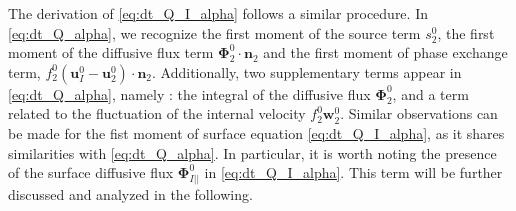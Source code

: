 The derivation of \ref{eq:dt_Q_I_alpha} follows a similar procedure. 
In \ref{eq:dt_Q_alpha}, we recognize the first moment of the source term $s_2^0$, the first moment of the diffusive flux term $\mathbf{\Phi}_2^0\cdot\textbf{n}_2$ and the first moment of phase exchange term, $f_2^0 (\textbf{u}_I^0-\textbf{u}_2^0)\cdot\textbf{n}_2$. 
Additionally, two supplementary terms appear in \ref{eq:dt_Q_alpha}, namely : the integral of the diffusive flux $\mathbf{\Phi}_2^0$, and a term related to the fluctuation of the internal velocity $f_2^0 \textbf{w}_2^0$.
Similar observations can be made for the fist moment of surface equation \ref{eq:dt_Q_I_alpha}, as it shares similarities with \ref{eq:dt_Q_alpha}. 
In particular, it is worth noting the presence of the surface diffusive flux $\mathbf{\Phi}_{I||}^0$ in \ref{eq:dt_Q_I_alpha}.
This term will be further discussed and analyzed in the following. 

